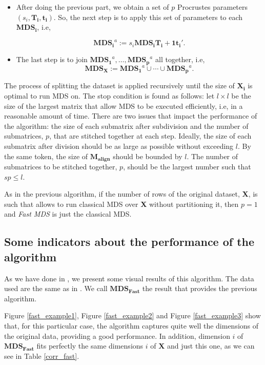 \documentclass[11pt]{report}
\begin{document}
\begin{itemize}
\item After doing the previous part, we obtain a set of $p$ Procrustes 
parameters $(s_i, \mathbf{T_i},  \mathbf{t_i})$. So, the next step is to 
apply this set of parameters to each $\mathbf{MDS_i}$, i.e, 

\[
\mathbf{MDS_i}^a := s_i \mathbf{MDS_i} \mathbf{T_i} + \mathbf{1t_i'}.
\]

\item The last step is to join $\mathbf{MDS_1}^a, \dots,  \mathbf{MDS_p}^a$ 
all together, i.e, 
\[
\mathbf{MDS_X}:= \mathbf{MDS_1}^a \cup \cdots \cup \mathbf{MDS_p}^a.
\]

\end{itemize}

\indent The process of splitting the dataset is applied recursively 
until the size of $\mathbf{X_i}$ is optimal to run MDS on. The stop condition 
is found as follows: let $l \times l$ be the size of the largest matrix that 
allow MDS to be executed efficiently, i.e, in a reasonable amount of time. 
There are two issues that impact the performance of the algorithm: the size 
of each submatrix after subdivision and the number of submatrices, $p$, that 
are stitched together at each step. Ideally, the size of each submatrix after 
division should be as large as possible without exceeding $l$. By the same 
token, the size of $\mathbf{M_{align}}$ should be bounded by $l$. The number of 
submatrices to be stitched together, $p$, should be the largest number such 
that $sp \leq l$.

\indent As in the previous algorithm, if the number of rows of the original 
dataset, \textbf{X}, is such that allows to run classical MDS over \textbf{X} 
without partitioning it, then $p=1$ and \textit{Fast MDS} is just the 
classical MDS.


\subsection{Some indicators about the performance of the algorithm}
As we have done in , we present some visual results of
this algorithm. The data used are the same as in . We
call $\mathbf{MDS_{Fast}}$ the result that provides the previous algorithm.

\indent Figure \ref{fast_example1}, Figure \ref{fast_example2} and
Figure \ref{fast_example3} show that, for this particular case,
the algorithm captures quite well the dimensions of the original data, 
providing a good performance. In addition, dimension $i$ of 
$\mathbf{MDS_{Fast}}$ fits perfectly the same dimensions $i$ of \textbf{X} and 
just this one, as we can see in Table \ref{corr_fast}.
\end{document}
